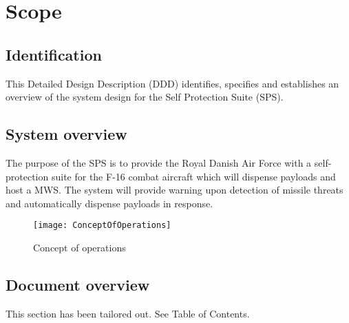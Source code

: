 \documentclass[Main]{subfiles}
\begin{document}
\chapter{Scope}

\section{Identification}
This Detailed Design Description (DDD) identifies, specifies and establishes an overview of the system design for the Self Protection Suite (SPS).

\section{System overview}
The purpose of the SPS is to provide the Royal Danish Air Force with a self-protection suite for the F-16 combat aircraft which will dispense payloads and host a MWS. 
The system will provide warning upon detection of missile threats and automatically dispense payloads in response.

\begin{figure}[H]
\centering
\texttt{[image: ConceptOfOperations]}
\caption{Concept of operations}
\end{figure}


\section{Document overview}
This section has been tailored out. See Table of Contents.
\end{document}
